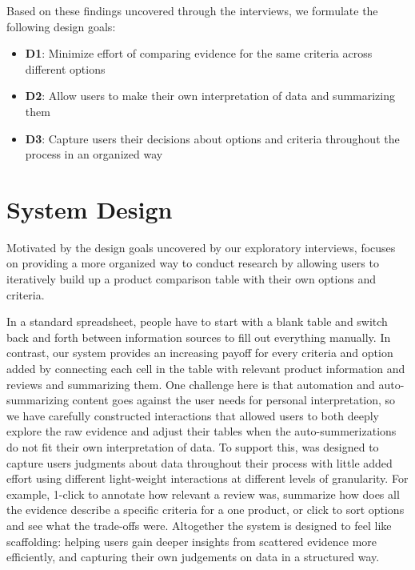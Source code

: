 Based on these findings uncovered through the interviews, we formulate the following design goals:

\begin{itemize}
  \setlength\itemsep{0em}

\item \textbf{D1}: Minimize effort of comparing evidence for the same criteria across different options
\item \textbf{D2}: Allow users to make their own interpretation of data and summarizing them
\item \textbf{D3}: Capture users their decisions about options and criteria throughout the process in an organized way
\end{itemize}

\section{System Design}

Motivated by the design goals uncovered by our exploratory interviews, \SYSTEM focuses on providing a more organized way to conduct research by allowing users to iteratively build up a product comparison table with their own options and criteria. 

In a standard spreadsheet, people have to start with a blank table and switch back and forth between information sources to fill out everything manually. In contrast, our system provides an increasing payoff for every criteria and option added by connecting each cell in the table with relevant product information and reviews and summarizing them. One challenge here is that automation and auto-summarizing content goes against the user needs for personal interpretation, so we have carefully constructed interactions that allowed users to both deeply explore the raw evidence and adjust their tables when the auto-summerizations do not fit their own interpretation of data. To support this, \SYSTEM was designed to capture users judgments about data throughout their process with little added effort using different light-weight interactions at different levels of granularity. For example, 1-click to annotate how relevant a review was, summarize how does all the evidence describe a specific criteria for a one product, or click to sort options and see what the trade-offs were. Altogether the system is designed to feel like scaffolding: helping users gain deeper insights from scattered evidence more efficiently, and capturing their own judgements on data in a structured way. 

